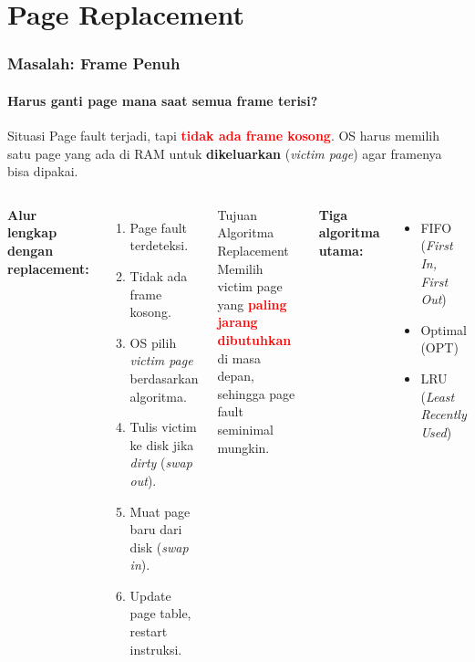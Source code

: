 \documentclass[t,aspectratio=169,xcolor=dvipsnames]{beamer}
\newcommand{\tem}[1]{\textbf{\textcolor{red}{#1}}}
\begin{document}
\section{Page Replacement}

\begin{frame}
    \frametitle{Masalah: Frame Penuh}
    \framesubtitle{Harus ganti page mana saat semua frame terisi?}
    \footnotesize

    \begin{alertblock}{Situasi}
        Page fault terjadi, tapi \tem{tidak ada frame kosong}. OS harus memilih satu page
        yang ada di RAM untuk \textbf{dikeluarkan} (\textit{victim page}) agar framenya bisa dipakai.
    \end{alertblock}

    \vspace{0.15cm}
    \begin{columns}[T]
        \textbf{Alur lengkap dengan replacement:}
        \begin{enumerate}
            \item Page fault terdeteksi.
            \item Tidak ada frame kosong.
            \item OS pilih \textit{victim page} berdasarkan algoritma.
            \item Tulis victim ke disk jika \textit{dirty} (\textit{swap out}).
            \item Muat page baru dari disk (\textit{swap in}).
            \item Update page table, restart instruksi.
        \end{enumerate}

        \begin{block}{Tujuan Algoritma Replacement}
            Memilih victim page yang \tem{paling jarang dibutuhkan} di masa depan, sehingga page fault seminimal mungkin.
        \end{block}

        \vspace{0.1cm}
        \textbf{Tiga algoritma utama:}
        \begin{itemize}
            \item FIFO (\textit{First In, First Out})
            \item Optimal (OPT)
            \item LRU (\textit{Least Recently Used})
        \end{itemize}
    \end{columns}
\end{frame}
\end{document}
